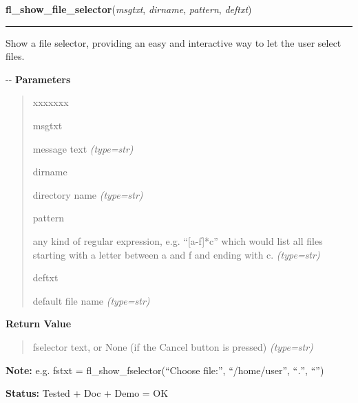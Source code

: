     \label{xformslib:flgoodies:fl_show_fselector}

    \vspace{0.5ex}

\hspace{.8\funcindent}\begin{boxedminipage}{\funcwidth}

    \raggedright \textbf{fl\_show\_file\_selector}(\textit{msgtxt}, \textit{dirname}, \textit{pattern}, \textit{deftxt})

    \vspace{-1.5ex}

    \rule{\textwidth}{0.5\fboxrule}
\setlength{\parskip}{2ex}

Show a file selector, providing an easy and interactive way to let
the user select files.

-{}-
\setlength{\parskip}{1ex}
      \textbf{Parameters}
      \vspace{-1ex}

      \begin{quote}
        \begin{Ventry}{xxxxxxx}

          \item[msgtxt]


message text
            {\it (type=str)}

          \item[dirname]


directory name
            {\it (type=str)}

          \item[pattern]


any kind of regular expression, e.g. ``{[}a-f{]}*c'' which would list all
files starting with a letter between a and f and ending with c.
            {\it (type=str)}

          \item[deftxt]


default file name
            {\it (type=str)}

        \end{Ventry}

      \end{quote}

      \textbf{Return Value}
    \vspace{-1ex}

      \begin{quote}

fselector text, or None (if the Cancel button is pressed)
      {\it (type=str)}

      \end{quote}

\textbf{Note:} 
e.g. fstxt = fl\_show\_fselector(``Choose file:'', ``/home/user'',
``\emph{.}'', ``'')


\textbf{Status:} 
Tested + Doc + Demo = OK


    \end{boxedminipage}

